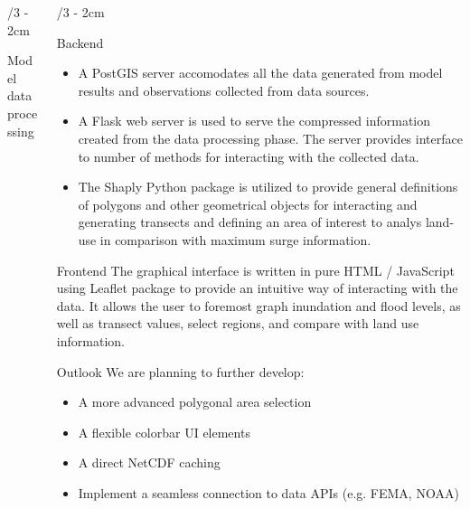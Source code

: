 \documentclass[landscape]{uioposter}
\begin{document}
\begin{frame}
\begin{columns}[onlytextwidth]
\begin{column}{\textwidth/3 - 2cm}
\begin{block}{Model data processing}
    \end{block}

\end{column}



\begin{column}{\textwidth/3 - 2cm}
    \begin{block}{Backend}
     \begin{itemize}
        \item A PostGIS server accomodates all the data generated
        from model results and observations collected from data sources.

        \item  A Flask web server is used to serve the compressed
        information created from the data processing phase. The server provides interface to number 
        of methods for interacting with the collected data. 
        
        \item The Shaply Python package is utilized to provide general
        definitions of polygons and other geometrical objects for interacting
        and generating transects and defining an area of interest to analys 
        land-use in comparison with maximum surge information.

     \end{itemize}
        
    \end{block}
    
     \begin{block}{Frontend}
        The graphical interface is written in pure HTML / JavaScript using
        Leaflet package to provide an intuitive way of interacting with the
        data. It allows the user to foremost graph inundation and ﬂood
        levels, as well as transect values, select regions, and compare with 
        land use information. 
    \end{block}
    

    \begin{block}{Outlook}
    We are planning to further develop:
    \begin{itemize}
  \item A more advanced polygonal area selection
  \item A flexible colorbar UI elements
  \item A direct NetCDF caching
  \item Implement a seamless connection to data APIs (e.g. FEMA, NOAA) 
\end{itemize}
    

\end{block}
\end{column}
\end{columns}
\end{frame}
\end{document}
